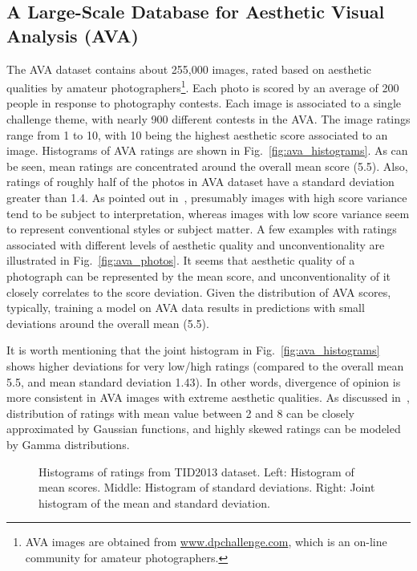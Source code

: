 \documentclass[10pt,twocolumn,twoside]{IEEEtran}
\begin{document}
 \subsection{A Large-Scale Database for Aesthetic Visual Analysis (AVA) \cite{murray2012ava}}
 The AVA dataset contains about 255,000 images, rated based on aesthetic qualities by amateur photographers\footnote{AVA images are obtained from \hyperref[www.dpchallenge.com]{www.dpchallenge.com}, which is an on-line community for amateur photographers.}. Each photo is scored by an average of 200 people in response to photography contests. Each image is associated to a single challenge theme, with nearly 900 different contests in the AVA. The image ratings range from 1 to 10, with 10 being the highest aesthetic score associated to an image. Histograms of AVA ratings are shown in Fig.~\ref{fig:ava_histograms}. As can be seen, mean ratings are concentrated around the overall mean score (5.5). Also, ratings of roughly half of the photos in AVA dataset have a standard deviation greater than 1.4. As pointed out in~\cite{murray2012ava}, presumably images with high score variance tend to be subject to interpretation, whereas images with low score variance seem to represent conventional styles or subject matter. A few examples with ratings associated with different levels of aesthetic quality and unconventionality are illustrated in Fig.~\ref{fig:ava_photos}. It seems that aesthetic quality of a photograph can be represented by the mean score, and unconventionality of it closely correlates to the score deviation. Given the distribution of AVA scores, typically, training a model on AVA data results in predictions with small deviations around the overall mean (5.5). 
 
It is worth mentioning that the joint histogram in Fig.~\ref{fig:ava_histograms} shows higher deviations for very low/high ratings (compared to the overall mean 5.5, and mean standard deviation 1.43). In other words, divergence of opinion is more consistent in AVA images with extreme aesthetic qualities. As discussed in~\cite{murray2012ava}, distribution of ratings with mean value between 2 and 8 can be closely approximated by Gaussian functions, and highly skewed ratings can be modeled by Gamma distributions.

 \begin{figure*}[!t]
\vspace{-0 mm}
\begin{center}
\end{center}
\vspace{-5 mm}
{\caption{Histograms of ratings from TID2013 dataset\cite{ponomarenko2013color}. Left: Histogram of mean scores. Middle: Histogram of standard deviations. Right: Joint histogram of the mean and standard deviation. \label{fig:tid_histograms}}}
\vspace{-0 mm}
\end{figure*}
\end{document}
